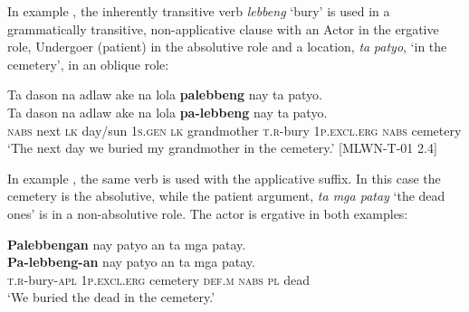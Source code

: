 In example , the inherently transitive verb \textit{lebbeng} ‘bury’ is used in a grammatically transitive, non-applicative clause with an Actor in the ergative role, Undergoer (patient) in the absolutive role and a location, \textit{ta} \textit{patyo}, ‘in the cemetery’, in an oblique role:

\ea
\label{bkm:Ref395171864}
Ta  dason  na  adlaw  ake  na  lola  \textbf{palebbeng} nay  ta  patyo. \\\smallskip
\gll Ta  dason  na  adlaw  ake  na  lola  \textbf{pa-lebbeng} nay  ta  patyo. \\
\textsc{nabs} next  \textsc{lk}  day/sun  1\textsc{s.gen}  \textsc{lk}  grandmother  \textsc{t.r}-bury
1\textsc{p.excl.erg}  \textsc{nabs}  cemetery \\
\glt `The next day we buried my grandmother in the cemetery.’ [MLWN-T-01 2.4]
\z

In example , the same verb is used with the applicative suffix. In this case the cemetery is the absolutive, while the patient argument, \textit{ta mga patay} ‘the dead ones’ is in a non-absolutive role. The actor is ergative in both examples:

\newpage
\ea
\label{bkm:Ref395171866}
\textbf{Palebbengan}  nay  patyo  an  ta  mga  patay. \\\smallskip
\gll \textbf{Pa-lebbeng-an}  nay  patyo  an  ta  mga  patay. \\
\textsc{t.r}-bury-\textsc{apl}  1\textsc{p.excl.erg}  cemetery  \textsc{def.m}  \textsc{nabs}  \textsc{pl}  dead \\
\glt ‘We buried the dead in the cemetery.’
\z

